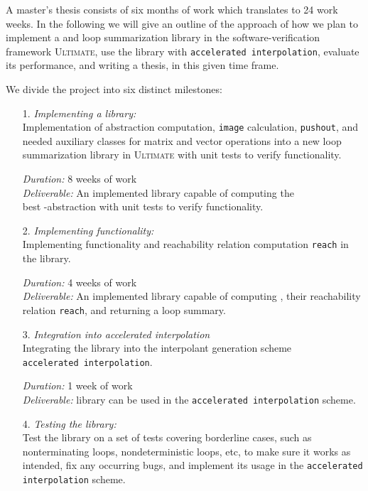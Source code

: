 A master's thesis consists of six months of work which translates to 24 work weeks. In the following we will give an outline of the approach of how we plan to implement a \qvasr and \qvasrs loop summarization library in the software-verification framework \textsc{Ultimate}, use the library with \texttt{accelerated interpolation}, evaluate its performance, and writing a thesis, in this given time frame. \\ \par
We divide the project into six distinct milestones:

\begin{itemize}
	\item[1.] \textsl{Implementing a \qvasr library:} \\
               Implementation of \qvasr abstraction computation, \qvasr \texttt{image} calculation, \texttt{pushout}, and needed auxiliary classes for matrix and vector operations into a new loop summarization library in \textsc{Ultimate} with unit tests to verify functionality.

			  \textsl{Duration:} 8 weeks of work \\
			  \textsl{Deliverable:} An implemented library capable of computing the \\ best \qvasr-abstraction with unit tests to verify functionality.

	\item[2.] \textsl{Implementing \qvasrs functionality:} \\
               Implementing \qvasrs functionality and reachability relation computation \texttt{reach} in the \qvasr library.

			  \textsl{Duration:} 4 weeks of work\\
			  \textsl{Deliverable:} An implemented library capable of computing \qvasrs, their reachability relation \texttt{reach}, and returning a loop summary.

	\item[3.] \textsl{Integration into accelerated interpolation} \\
			  Integrating the library into the interpolant generation scheme \\ \texttt{accelerated interpolation}.
	
			  \textsl{Duration:} 1 week of work \\
			  \textsl{Deliverable:} \qvasrs library can be used in the \texttt{accelerated interpolation} scheme.

	\item[4.] \textsl{Testing the library:} \\
               Test the library on a set of tests covering borderline cases, such as nonterminating loops, nondeterministic loops, etc, to make sure it works as intended, fix any occurring bugs, and implement its usage in the \texttt{accelerated interpolation} scheme.


\end{itemize}
